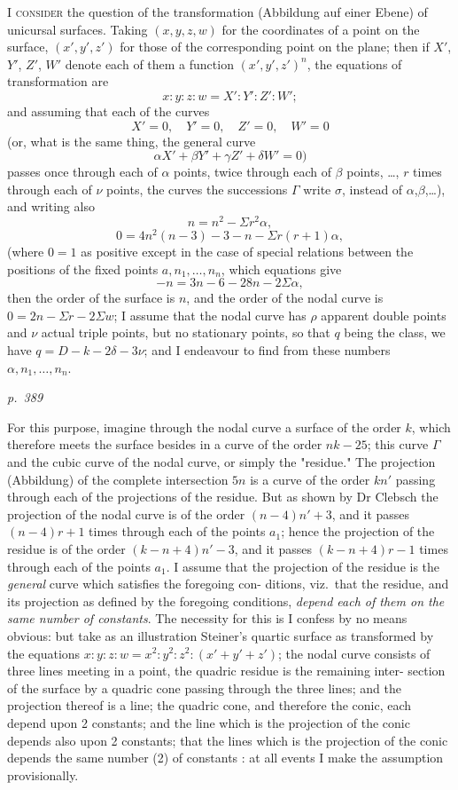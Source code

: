 \documentclass[11pt,a4paper]{book}
\begin{document}
\noindent
\textsc{I consider} the question of the transformation (Abbildung auf einer Ebene) of
unicursal surfaces.  Taking $(x, y, z, w)$ for the coordinates of a point on the surface,
$(x', y', z')$ for those of the corresponding point on the plane; then if $X'$, $Y'$, $Z'$, $W'$
denote each of them a function $(x', y', z')^n$, the equations of transformation are
\[
x : y : z : w = X' : Y' : Z' : W';
\]
and assuming that each of the curves
\[
X' = 0, \quad Y' = 0, \quad Z' = 0, \quad W' = 0
\]
(or, what is the same thing, the general curve
\[
\alpha X' + \beta Y' + \gamma Z' + \delta W' = 0)
\]
passes once through each of $\alpha$ points, twice through each of $\beta$ points, \ldots, $r$ times
through each of $\nu$ points, the curves the successions $\Gamma$ write $\sigma$, instead of $\alpha$,$\beta$,\ldots), and writing also
\[
n = n^2 - \Sigma r^2 \alpha,
\]
\[
0 = 4n^2(n - 3) - 3 - n - \Sigma r(r + 1)\alpha,
\]
(where $0 = 1$ as positive except in the case of special relations between the positions
of the fixed points $a, n_1, \ldots, n_n$, which equations give
\[
-n = 3n - 6 - 28n - 2\Sigma\alpha,
\]
then the order of the surface is $n$, and the order of the nodal curve is $0 = 2 n - \Sigma r - 2 \Sigma w$;
I assume that the nodal curve has $\rho$ apparent double points and $\nu$ actual triple points,
but no stationary points, so that $q$ being the class, we have $q = D - k - 2 \delta - 3 \nu$; and
I endeavour to find from these numbers $\alpha, n_1, \ldots, n_n$.

\clearpage

\bigskip
\textit{p.~389}
\smallskip

\noindent
For this purpose, imagine through the nodal curve a surface of the order $k$, which
therefore meets the surface besides in a curve of the order $n k - 25$; this curve $\Gamma$ and
the cubic curve of the nodal curve, or simply the "residue."  The projection (Abbildung) of
the complete intersection $5n$ is a curve of the order $kn'$ passing through each
of the projections of the residue.  But as shown by Dr Clebsch the projection of the
nodal curve is of the order $(n - 4)n' + 3$, and it passes $(n - 4)r + 1$ times through each
of the points $a_1$; hence the projection of the residue is of the order $(k - n + 4)n' - 3$,
and it passes $(k - n + 4)r - 1$ times through each of the points $a_1$.  I assume that
the projection of the residue is the \textit{general} curve which satisfies the foregoing con-
ditions, viz.\ that the residue, and its projection as defined by the foregoing conditions,
\textit{depend each of them on the same number of constants}.  The necessity for this is I
confess by no means obvious: but take as an illustration Steiner's quartic surface as
transformed by the equations $x : y : z : w = x^2 : y^2 : z^2 : (x' + y' + z')$; the nodal curve
consists of three lines meeting in a point, the quadric residue is the remaining inter-
section of the surface by a quadric cone passing through the three lines; and the
projection thereof is a line; the quadric cone, and therefore the conic, each depend
upon 2 constants; and the line which is the projection of the conic depends also
upon 2 constants; that the lines which is the projection of the conic depends
the same number (2) of constants : at all events I make the assumption provisionally.
\end{document}
